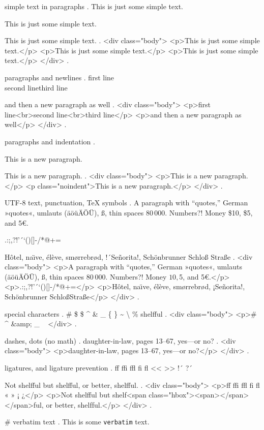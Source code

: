 simple text in paragraphs
.
This is just some simple text.

This is just some simple text.

This is just some simple text.
.
<div class="body">
<p>This is just some simple text.</p>
<p>This is just some simple text.</p>
<p>This is just some simple text.</p>
</div>
.


paragraphs and newlines
.
first line\\second line\newline third line\par and then a new paragraph as well
.
<div class="body">
<p>ﬁrst line<br>second line<br>third line</p>
<p>and then a new paragraph as well</p>
</div>
.


paragraphs and indentation
.
\noindent

\noindent

This is a new paragraph.

\noindent
This is a new paragraph.
.
<div class="body">
<p>This is a new paragraph.</p>
<p class="noindent">This is a new paragraph.</p>
</div>
.


UTF-8 text, punctuation, TeX symbols
.
A para\-graph with “quotes,” German »quotes«, umlauts (äöüÄÖÜ), ß, thin spaces 80\,000. Numbers?! Money \$10, \$5, and 5€.

.:;,?!'´`()[]-/*@+=

H\^otel, na\"\i ve, \'el\`eve, sm\o rrebr\o d, !´Se\~norita!, Sch\"onbrunner Schlo\ss{} Stra\ss e
.
<div class="body">
<p>A para­graph with “quotes,” German »quotes«, umlauts (äöüÄÖÜ), ß, thin spaces 80 000. Numbers?! Money $10, $5, and 5€.</p>
<p>.:;,?!’´‘()[]‐/*@+=</p>
<p>Hôtel, naı̈ve, élève, smørrebrød, ¡Señorita!, Schönbrunner Schloß​ Straße</p>
</div>
.


special characters
.
\# \$ \$ \^{} \& \_ \{ \} \~{} \textbackslash{} \% shelf\-ful
.
<div class="body">
<p># $ $ ^​ &amp; _ { } ~​ \​ %
</div>
.


dashes, dots (no math)
.
daughter-in-law, pages 13--67, yes---or no?
.
<div class="body">
<p>daughter‐in‐law, pages 13–67, yes—or no?</p>
</div>
.


ligatures, and ligature prevention
.
ff ffi ffl fi fl << >> !´ ?´

Not shelfful but shelf\mbox{}ful, or better, shelf\/ful.
.
<div class="body">
<p>ﬀ ﬃ ﬄ ﬁ ﬂ « » ¡ ¿</p>
<p>Not shelﬀul but shelf<span class="hbox"><span></span></span>ful, or better, shelf‌ful.</p>
</div>
.


#
verbatim text
.
This is some \verb|verbatim| text.

